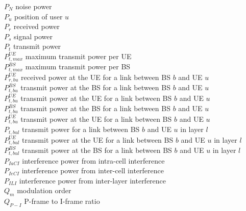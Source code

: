 
$P_N$ \mytab noise power \\
$P_u$ \mytab position of user $u$ \\
$P_r$ \mytab received power \\
$P_s$ \mytab signal power \\
$P_t$ \mytab transmit power \\
$P_{t, max}^{UE}$ \mytab maximum transmit power per UE\\
$P_{t, max}^{BS}$ \mytab maximum transmit power per BS \\
$P_{r, bu}^{UE}$ \mytab received power at the UE for a link between BS $b$ and UE $u$ \\
$P_{t, bu}^{BS}$ \mytab transmit power at the BS for a link between BS $b$ and UE $u$ \\
$P_{t, bu}^{UE}$ \mytab transmit power at the UE for a link between BS $b$ and UE $u$ \\
$P_{t, bu}^{BS}$ \mytab transmit power at the BS for a link between BS $b$ and UE $u$ \\
$P_{t, bu}^{UE}$ \mytab transmit power at the UE for a link between BS $b$ and UE $u$ \\
$P_{t, bul}$ \mytab transmit power for a link between BS $b$ and UE $u$ in layer $l$ \\
$P_{t, bul}^{UE}$ \mytab transmit power at the UE for a link between BS $b$ and UE $u$ in layer $l$ \\
$P_{t, bul}^{BS}$ \mytab transmit power at the BS for a link between BS $b$ and UE $u$ in layer $l$ \\
$P_{IaCI}$ \mytab interference power from intra-cell interference \\
$P_{IeCI}$ \mytab interference power from inter-cell interference \\
$P_{ILI}$ \mytab interference power from inter-layer interference \\



$Q_m$ \mytab modulation order \\
$Q_{P-I}$ \mytab P-frame to I-frame ratio \\

